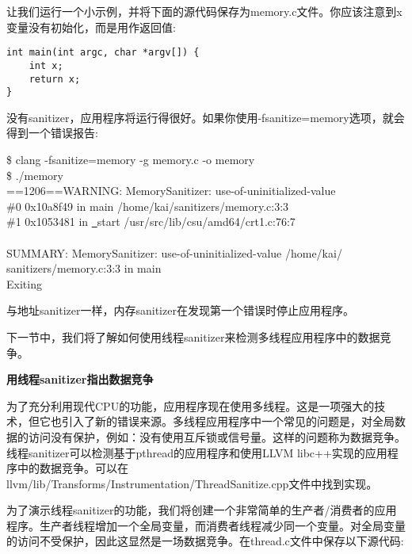 让我们运行一个小示例，并将下面的源代码保存为memory.c文件。你应该注意到x变量没有初始化，而是用作返回值:\par

\begin{lstlisting}[caption={}]
int main(int argc, char *argv[]) {
	int x;
	return x;
}
\end{lstlisting}

没有sanitizer，应用程序将运行得很好。如果你使用-fsanitize=memory选项，就会得到一个错误报告:\par

\begin{tcolorbox}[colback=white,colframe=black]
\$ clang -fsanitize=memory -g memory.c -o memory \\
\$ ./memory \\
==1206==WARNING: MemorySanitizer: use-of-uninitialized-value \\
\hspace*{1cm}\#0 0x10a8f49 in main /home/kai/sanitizers/memory.c:3:3 \\
\hspace*{1cm}\#1 0x1053481 in \underline{~}start /usr/src/lib/csu/amd64/crt1.c:76:7 \\
\\
SUMMARY: MemorySanitizer: use-of-uninitialized-value /home/kai/ \\
sanitizers/memory.c:3:3 in main \\
Exiting
\end{tcolorbox}

与地址sanitizer一样，内存sanitizer在发现第一个错误时停止应用程序。\par

下一节中，我们将了解如何使用线程sanitizer来检测多线程应用程序中的数据竞争。\par

\hspace*{\fill} \par %
\textbf{用线程sanitizer指出数据竞争}

为了充分利用现代CPU的功能，应用程序现在使用多线程。这是一项强大的技术，但它也引入了新的错误来源。多线程应用程序中一个常见的问题是，对全局数据的访问没有保护，例如：没有使用互斥锁或信号量。这样的问题称为数据竞争。线程sanitizer可以检测基于pthread的应用程序和使用LLVM libc++实现的应用程序中的数据竞争。可以在llvm/lib/Transforms/Instrumentation/\allowbreak ThreadSanitize.cpp文件中找到实现。\par

为了演示线程sanitizer的功能，我们将创建一个非常简单的生产者/消费者的应用程序。生产者线程增加一个全局变量，而消费者线程减少同一个变量。对全局变量的访问不受保护，因此这显然是一场数据竞争。在thread.c文件中保存以下源代码:\par

